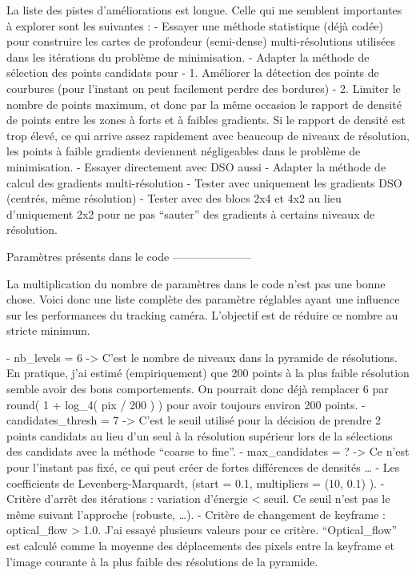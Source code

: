 La liste des pistes d’améliorations est longue. Celle qui me semblent importantes à explorer sont les suivantes :
- Essayer une méthode statistique (déjà codée) pour construire les cartes de profondeur (semi-dense) multi-résolutions utilisées dans les itérations du problème de minimisation.
- Adapter la méthode de sélection des points candidats pour
  - 1. Améliorer la détection des points de courbures (pour l’instant on peut facilement perdre des bordures)
  - 2. Limiter le nombre de points maximum, et donc par la même occasion le rapport de densité de points entre les zones à forts et à faibles gradients. Si le rapport de densité est trop élevé, ce qui arrive assez rapidement avec beaucoup de niveaux de résolution, les points à faible gradients deviennent négligeables dans le problème de minimisation.
  - Essayer directement avec DSO aussi
- Adapter la méthode de calcul des gradients multi-résolution
  - Tester avec uniquement les gradients DSO (centrés, même résolution)
  - Tester avec des blocs 2x4 et 4x2 au lieu d’uniquement 2x2 pour ne pas “sauter” des gradients à certains niveaux de résolution.

Paramètres présents dans le code
---------------------

La multiplication du nombre de paramètres dans le code n’est pas une bonne chose. Voici donc une liste complète des paramètre réglables ayant une influence sur les performances du tracking caméra. L’objectif est de réduire ce nombre au stricte minimum.

- nb\_levels = 6 -> C’est le nombre de niveaux dans la pyramide de résolutions. En pratique, j’ai estimé (empiriquement) que 200 points à la plus faible résolution semble avoir des bons comportements. On pourrait donc déjà remplacer 6 par round( 1 + log\_4( pix / 200 ) ) pour avoir toujours environ 200 points.
- candidates\_thresh = 7 -> C’est le seuil utilisé pour la décision de prendre 2 points candidats au lieu d’un seul à la résolution supérieur lors de la sélections des candidats avec la méthode “coarse to fine”.
- max\_candidates = ? -> Ce n’est pour l’instant pas fixé, ce qui peut créer de fortes différences de densités …
- Les coefficients de Levenberg-Marquardt, (start = 0.1, multipliers = (10, 0.1) ).
- Critère d’arrêt des itérations : variation d’énergie < seuil. Ce seuil n’est pas le même suivant l’approche (robuste, …).
- Critère de changement de keyframe : optical\_flow > 1.0. J’ai essayé plusieurs valeurs pour ce critère. “Optical\_flow” est calculé comme la moyenne des déplacements des pixels entre la keyframe et l’image courante à la plus faible des résolutions de la pyramide.


